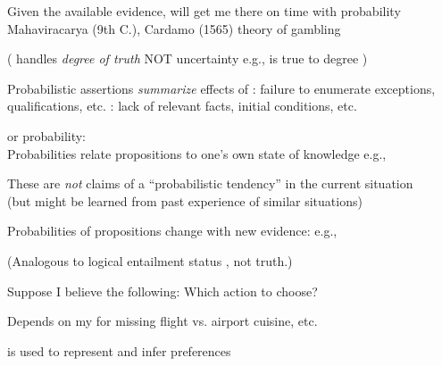 \documentclass{article}
\begin{document}
\begin{huge}
\al
  Given the available evidence,\nl
     will get me there on time with probability \\
Mahaviracarya (9th C.), Cardamo (1565) theory of gambling

( handles \emph{degree of truth} NOT uncertainty e.g.,\al
   is true to degree )




Probabilistic assertions \emph{summarize} effects of\al
  : failure to enumerate exceptions, qualifications, etc.\al
  : lack of relevant facts, initial conditions, etc.

 or  probability:\\
Probabilities relate propositions to one's own state of knowledge\nl
e.g., 

These are \emph{not} claims of a ``probabilistic
tendency'' in the current situation\\
(but might be learned from past experience of similar situations)

Probabilities of propositions change with new evidence:\nl
e.g., 

(Analogous to logical entailment status , not truth.)




Suppose I believe the following:
Which action to choose?

Depends on my  for missing flight vs. airport cuisine, etc.

 is used to represent and infer preferences


\end{huge}
\end{document}
